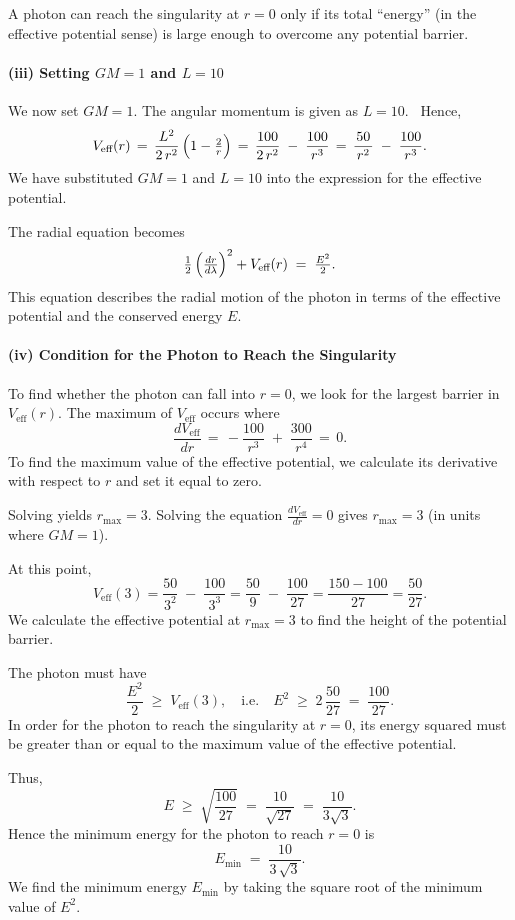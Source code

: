 \documentclass{article}
\begin{document}
A photon can reach the singularity at \(r=0\) only if its total ``energy'' (in the effective potential sense) is large enough to overcome any potential barrier.

\paragraph{(iii) Setting \(GM=1\) and \(L=10\)}
We now set \(GM=1\). The angular momentum is given as \(L=10\). 
Hence,
\[
V_{\text{eff}}(r)
\,=\,
\frac{L^2}{2\,r^2}\,\Bigl(1-\tfrac{2}{r}\Bigr)
\,=\,
\frac{100}{2\,r^2}
\;-\;
\frac{100}{\,r^3\,}
\,=\,
\frac{50}{\,r^2\,}
\;-\;
\frac{100}{\,r^3\,}.
\]
We have substituted \(GM=1\) and \(L=10\) into the expression for the effective potential.

The radial equation becomes
\[
\tfrac12\,\Bigl(\tfrac{dr}{d\lambda}\Bigr)^2 + V_{\text{eff}}(r)
\;=\;
\tfrac{E^2}{2}.
\]
This equation describes the radial motion of the photon in terms of the effective potential and the conserved energy \(E\).

\paragraph{(iv) Condition for the Photon to Reach the Singularity}
To find whether the photon can fall into \(r=0\), we look for the largest barrier in \(V_{\text{eff}}(r)\). The maximum of \(V_{\text{eff}}\) occurs where
\[
\frac{dV_{\text{eff}}}{dr} 
\,=\,
-\frac{100}{r^3}
\;+\;
\frac{300}{r^4}
\,=\,0.
\]
To find the maximum value of the effective potential, we calculate its derivative with respect to \(r\) and set it equal to zero.

Solving yields \(r_{\max} = 3\). Solving the equation \(\frac{dV_{\text{eff}}}{dr} = 0\) gives \(r_{\max} = 3\) (in units where \(GM=1\)).

At this point,
\[
V_{\text{eff}}(3)
=
\frac{50}{3^2}
\;-\;
\frac{100}{3^3}
=
\frac{50}{9}
\;-\;
\frac{100}{27}
=
\frac{150 - 100}{27}
=
\frac{50}{27}.
\]
We calculate the effective potential at \(r_{\max} = 3\) to find the height of the potential barrier.

The photon must have
\[
\frac{E^2}{2}
\;\ge\;
V_{\text{eff}}(3),
\quad\text{i.e.}\quad
E^2
\;\ge\;
2\,\frac{50}{27}
\;=\;
\frac{100}{27}.
\]
In order for the photon to reach the singularity at \(r=0\), its energy squared must be greater than or equal to the maximum value of the effective potential.

Thus,
\[
E
\;\ge\;
\sqrt{\frac{100}{27}}
\;=\;
\frac{10}{\sqrt{27}}
\;=\;
\frac{10}{3\sqrt{3}}.
\]
Hence the minimum energy for the photon to reach \(r=0\) is
\[
E_{\min}
\;=\;
\frac{10}{3\,\sqrt{3}}.
\]
We find the minimum energy \(E_{\min}\) by taking the square root of the minimum value of \(E^2\).
\end{document}
